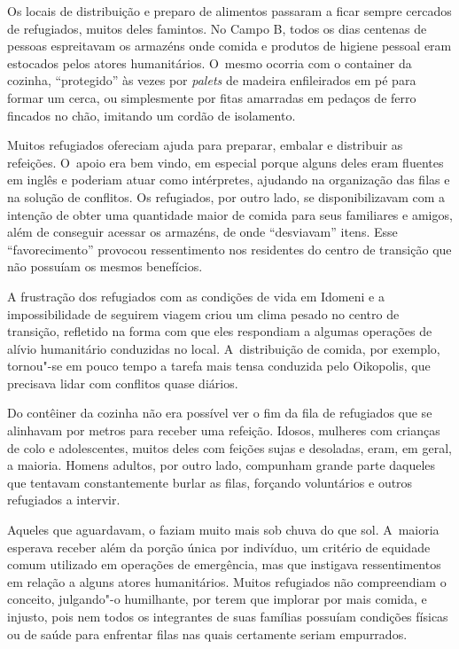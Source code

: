 Os locais de distribuição e preparo de alimentos passaram a ficar sempre
cercados de refugiados, muitos deles famintos. No Campo B, todos os dias
centenas de pessoas espreitavam os armazéns onde comida e produtos de
higiene pessoal eram estocados pelos atores humanitários. O~mesmo
ocorria com o container da cozinha, ``protegido'' às vezes por
\emph{palets} de madeira enfileirados em pé para formar um cerca, ou
simplesmente por fitas amarradas em pedaços de ferro fincados no chão,
imitando um cordão de isolamento.

Muitos refugiados ofereciam ajuda para preparar, embalar e distribuir as
refeições. O~apoio era bem vindo, em especial porque alguns deles eram
fluentes em inglês e poderiam atuar como intérpretes, ajudando na
organização das filas e na solução de conflitos. Os refugiados, por
outro lado, se disponibilizavam com a intenção de obter uma quantidade
maior de comida para seus familiares e amigos, além de conseguir acessar
os armazéns, de onde ``desviavam'' itens. Esse ``favorecimento''
provocou ressentimento nos residentes do centro de transição que não
possuíam os mesmos benefícios.

A frustração dos refugiados com as condições de vida em Idomeni e a
impossibilidade de seguirem viagem criou um clima pesado no centro de
transição, refletido na forma com que eles respondiam a algumas
operações de alívio humanitário conduzidas no local. A~distribuição de
comida, por exemplo, tornou"-se em pouco tempo a tarefa mais tensa
conduzida pelo Oikopolis, que precisava lidar com conflitos quase
diários.


Do contêiner da cozinha não era possível ver o fim da fila de refugiados
que se alinhavam por metros para receber uma refeição. Idosos, mulheres
com crianças de colo e adolescentes, muitos deles com feições sujas e
desoladas, eram, em geral, a maioria. Homens adultos, por outro lado,
compunham grande parte daqueles que tentavam constantemente burlar as filas,
forçando voluntários e outros refugiados a intervir.

Aqueles que aguardavam, o faziam muito mais sob chuva do que sol.
A~maioria esperava receber além da porção única por indivíduo, um
critério de equidade comum utilizado em operações de emergência, mas que
instigava ressentimentos em relação a alguns atores humanitários. Muitos
refugiados não compreendiam o conceito, julgando"-o humilhante, por terem
que implorar por mais comida, e injusto, pois nem todos os integrantes de
suas famílias possuíam condições físicas ou de saúde para enfrentar
filas nas quais certamente seriam empurrados.

